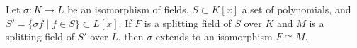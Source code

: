 Let $\sigma : K \to L$ be an isomorphism of fields, $S \subset K[x]$ a set of polynomials, and $S' = \{\sigma f \mid f \in S\} \subset L[x]$. If $F$ is a splitting field of $S$ over $K$ and $M$ is a splitting field of $S'$ over $L$, then $\sigma$ extends to an isomorphism $F \cong M$.
